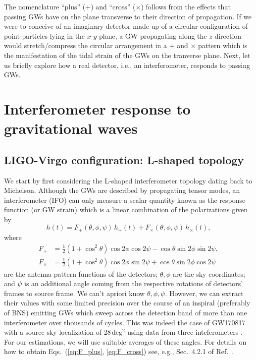\documentclass[amsmath,amssymb,aps,floats,amsfonts,notitlepage,superscriptaddress,eqsecnum,nofootinbib,10pt]{revtex4-1}
\newcommand{\f}{\frac}
\newcommand{\be}{\begin{equation}}
\newcommand{\ee}{\end{equation}}
\begin{document}
The nomenclature ``plus'' ($+$) and ``cross'' ($\times$) follows from the effects that passing GWs have on the plane transverse to their direction of propagation.
If we were to conceive of an imaginary detector made up of a circular configuration of point-particles lying in the $x$-$y$ plane, a GW propagating along the $z$ direction would stretch/compress the circular arrangement in a $+$ and $\times$ pattern which is the manifestation of the tidal strain of the GWs on the tranverse plane.
Next, let us briefly explore how a real detector, i.e., an interferometer, responds to passing GWs.


\section{Interferometer response to gravitational waves}\label{sec:IFO_response}
\subsection{LIGO-Virgo configuration: L-shaped topology}\label{sec:LIGO_topo}
We start by first considering the L-shaped interferometer topology dating back to Michelson.
Although the GWs are described by propagating tensor modes, an interferometer (IFO) can only measure a scalar quantity
known as the response function (or GW strain)
which is a linear combination of the polarizations given by
%
\be
h(t) = F_+(\theta,\phi,\psi) \,h_+(t)+F_\times(\theta,\phi,\psi)\, h_\times(t) , \label{eq:detector_strain}
\ee
%
where
%
\begin{align}
 F_+ &=\f{1}{2}\left(1+\cos^2\theta\right)\cos2\phi\cos 2\psi-\cos\theta \sin2\phi \sin2\psi \label{eq:F_plus},\\
 F_\times &=\f{1}{2}\left(1+\cos^2\theta\right)\cos2\phi\sin2\psi+\cos\theta \sin2\phi \cos2\psi \label{eq:F_cross}
\end{align}
%
are the antenna pattern functions of the detectors; $\theta,\phi$ are the sky coordinates; and $\psi$ is
an additional angle coming from the respective rotations of detectors' frames to source frame. %
%
We can't apriori know $\theta, \phi,\psi$. However, we can extract their values with some limited precision over the course of an inspiral (preferably of BNS) 
emitting GWs which sweep across the detection band of more than one interferometer over thousands of cycles. This was indeed the case of GW170817
with a source sky localization of 28\,deg$^2$ using data from three inteferometers \cite{GW170817}. 
For our estimations, we will use suitable averages of these angles.
For details on how to obtain Eqs.~(\ref{eq:F_plus}, \ref{eq:F_cross}) see, e.g., Sec.~4.2.1 of Ref.~\cite{SchutzLRR}.
\end{document}
